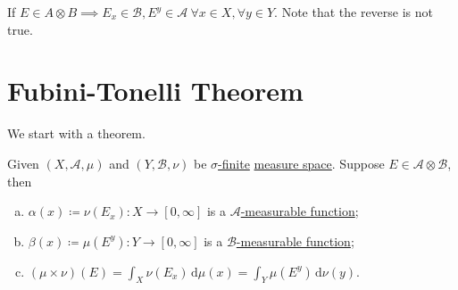 \begin{prev}
	If \(E\in A\otimes B\implies E_{x} \in \mathcal{B} , E^y\in \mathcal{A}\ \forall x\in X, \forall y\in Y\).
	Note that the reverse is not true.
\end{prev}

\section{Fubini-Tonelli Theorem}
We start with a theorem.

\begin{theorem}\label{thm:Tonelli-for-characteristic-functions}
	Given \((X, \mathcal{A} , \mu )\) and \((Y, \mathcal{B} , \nu )\) be \hyperref[def:sigma-finite-measure]{\(\sigma\)-finite} \hyperref[def:measure-space]{measure space}. Suppose \(E\in \mathcal{A} \otimes \mathcal{B} \), then
	\begin{enumerate}[(a)]
		\item\label{thm:Tonelli-for-characteristic-functions-a} \(\alpha (x)\coloneqq \nu (E_x)\colon X\to [0, \infty ]\) is a \hyperref[def:A-measurable-function]{\(\mathcal{A}\)-measurable function};
		\item\label{thm:Tonelli-for-characteristic-functions-b} \(\beta (x)\coloneqq \mu (E^y)\colon Y\to [0, \infty ]\) is a \hyperref[def:A-measurable-function]{\(\mathcal{B}\)-measurable function};
		\item\label{thm:Tonelli-for-characteristic-functions-c} \((\mu \times \nu) (E) = \int_X \nu (E_x)\,\mathrm{d} \mu(x) = \int _Y \mu (E^y)\,\mathrm{d} \nu (y)\).
	\end{enumerate}
\end{theorem}
